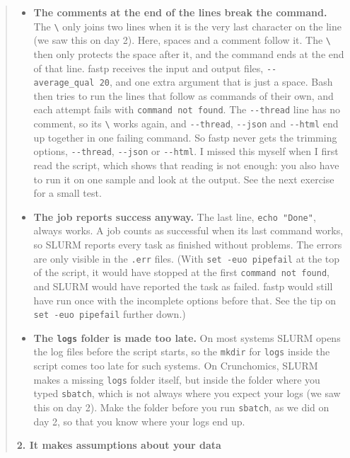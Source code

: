 \documentclass[
  letterpaper,
  DIV=11,
  numbers=noendperiod]{scrreprt}
\providecommand{\tightlist}{%
  \setlength{\itemsep}{0pt}\setlength{\parskip}{0pt}}
\begin{document}
\begin{tcolorbox}
\begin{quote}
\begin{itemize}
\tightlist
\item
  \textbf{The comments at the end of the lines break the command.} The
  \texttt{\textbackslash{}} only joins two lines when it is the very
  last character on the line (we saw this on day 2). Here, spaces and a
  comment follow it. The \texttt{\textbackslash{}} then only protects
  the space after it, and the command ends at the end of that line.
  fastp receives the input and output files,
  \texttt{-\/-average\_qual\ 20}, and one extra argument that is just a
  space. Bash then tries to run the lines that follow as commands of
  their own, and each attempt fails with \texttt{command\ not\ found}.
  The \texttt{-\/-thread} line has no comment, so its
  \texttt{\textbackslash{}} works again, and \texttt{-\/-thread},
  \texttt{-\/-json} and \texttt{-\/-html} end up together in one failing
  command. So fastp never gets the trimming options,
  \texttt{-\/-thread}, \texttt{-\/-json} or \texttt{-\/-html}. I missed
  this myself when I first read the script, which shows that reading is
  not enough: you also have to run it on one sample and look at the
  output. See the next exercise for a small test.
\item
  \textbf{The job reports success anyway.} The last line,
  \texttt{echo\ "Done"}, always works. A job counts as successful when
  its last command works, so SLURM reports every task as finished
  without problems. The errors are only visible in the \texttt{.err}
  files. (With \texttt{set\ -euo\ pipefail} at the top of the script, it
  would have stopped at the first \texttt{command\ not\ found}, and
  SLURM would have reported the task as failed. fastp would still have
  run once with the incomplete options before that. See the tip on
  \texttt{set\ -euo\ pipefail} further down.)
\item
  \textbf{The \texttt{logs} folder is made too late.} On most systems
  SLURM opens the log files before the script starts, so the
  \texttt{mkdir} for \texttt{logs} inside the script comes too late for
  such systems. On Crunchomics, SLURM makes a missing \texttt{logs}
  folder itself, but inside the folder where you typed \texttt{sbatch},
  which is not always where you expect your logs (we saw this on day 2).
  Make the folder before you run \texttt{sbatch}, as we did on day 2, so
  that you know where your logs end up.
\end{itemize}

\textbf{2. It makes assumptions about your data}


\end{quote}
\end{tcolorbox}
\end{document}
